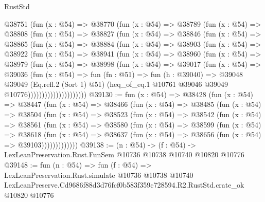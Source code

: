 \begin{lexlean}{RustStd}
\begin{coremodule}
          @38751
            (fun (x : @54) =>
            @38770
              (fun (x : @54) =>
              @38789
                (fun (x : @54) =>
                @38808
                  (fun (x : @54) =>
                  @38827
                    (fun (x : @54) =>
                    @38846
                      (fun (x : @54) =>
                      @38865
                        (fun (x : @54) =>
                        @38884
                          (fun (x : @54) =>
                          @38903
                            (fun (x : @54) =>
                            @38922
                              (fun (x : @54) =>
                              @38941
                                (fun (x : @54) =>
                                @38960
                                  (fun (x : @54) =>
                                  @38979
                                    (fun (x : @54) =>
                                    @38998
                                      (fun (x : @54) =>
                                      @39017
                                        (fun (x : @54) =>
                                        @39036
                                          (fun (x : @54) =>
                                          fun (fn : @51) =>
                                          fun (h : @39040) =>
                                          @39048
                                            @39049
                                            (Eq.refl.{2} (Sort 1) @51)
                                            (heq_of_eq.{1}
                                              @10761
                                              @39046
                                              @39049
                                              @10776)))))))))))))))))))))
@39130 := fun (x : @54) =>
  @38428
    (fun (x : @54) =>
    @38447
      (fun (x : @54) =>
      @38466
        (fun (x : @54) =>
        @38485
          (fun (x : @54) =>
          @38504
            (fun (x : @54) =>
            @38523
              (fun (x : @54) =>
              @38542
                (fun (x : @54) =>
                @38561
                  (fun (x : @54) =>
                  @38580
                    (fun (x : @54) =>
                    @38599
                      (fun (x : @54) =>
                      @38618
                        (fun (x : @54) =>
                        @38637 (fun (x : @54) => @38656 (fun (x : @54) => @39103)))))))))))))
@39138 := (n : @54) ->
  (f : @54) -> LexLeanPreservation.Rust.FunSem @10736 @10738 @10740 @10820 @10776
@39148 := fun (n : @54) =>
  fun (f : @54) =>
  LexLeanPreservation.Rust.simulate
    @10736
    @10738
    @10740
    LexLeanPreserve.Cd9686f88d3d76fcf0b583f359c728594.R2.RustStd.crate_ok
    @10820
    @10776
\end{coremodule}
\end{lexlean}
